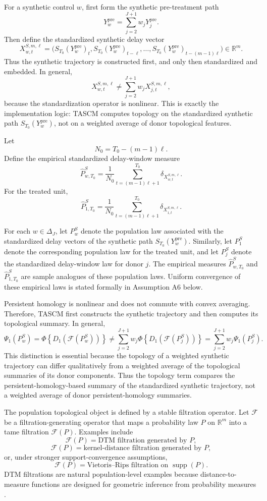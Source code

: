 \documentclass[11pt]{article}
\theoremstyle{plain}
\theoremstyle{definition}
\theoremstyle{remark}
\DeclareMathOperator{\supp}{supp}
\newcommand{\1}{\mathbbm{1}}
\newcommand{\pre}{\mathrm{pre}}
\begin{document}
For a synthetic control \(w\), first form the synthetic pre-treatment path
\[
Y_w^{\pre}
=
\sum_{j=2}^{J+1}w_jY_j^{\pre}.
\]
Then define the standardized synthetic delay vector
\[
X_{w,t}^{S,m,\ell}
=
\bigl(
S_{T_0}(Y_w^{\pre})_t,
S_{T_0}(Y_w^{\pre})_{t-\ell},
\ldots,
S_{T_0}(Y_w^{\pre})_{t-(m-1)\ell}
\bigr)
\in\mathbb R^m.
\]
Thus the synthetic trajectory is constructed first, and only then standardized
and embedded. In general,
\[
X_{w,t}^{S,m,\ell}
\neq
\sum_{j=2}^{J+1}w_jX_{j,t}^{S,m,\ell},
\]
because the standardization operator is nonlinear. This is exactly the
implementation logic: TASCM computes topology on the standardized synthetic
path \(S_{T_0}(Y_w^{\pre})\), not on a weighted average of donor topological
features.

Let
\[
N_0=T_0-(m-1)\ell.
\]
Define the empirical standardized delay-window measure
\[
\widehat P_{w,T_0}^{S}
=
\frac{1}{N_0}
\sum_{t=(m-1)\ell+1}^{T_0}
\delta_{X_{w,t}^{S,m,\ell}}.
\]
For the treated unit,
\[
\widehat P_{1,T_0}^{S}
=
\frac{1}{N_0}
\sum_{t=(m-1)\ell+1}^{T_0}
\delta_{X_{1,t}^{S,m,\ell}}.
\]

For each \(w\in\Delta_J\), let \(P_w^{S}\) denote the population law associated
with the standardized delay vectors of the synthetic path
\(S_{T_0}(Y_w^{\pre})\). Similarly, let \(P_1^{S}\) denote the corresponding
population law for the treated unit, and let \(P_j^{S}\) denote the
standardized delay-window law for donor \(j\). The empirical measures
\(\widehat P_{w,T_0}^{S}\) and \(\widehat P_{1,T_0}^{S}\) are sample analogues
of these population laws. Uniform convergence of these empirical laws is stated
formally in Assumption A6 below.

Persistent homology is nonlinear and does not commute with convex averaging.
Therefore, TASCM first constructs the synthetic trajectory and then computes its
topological summary. In general,
\[
\Psi_1(P_w^{S})
=
\Phi\left\{
D_1\left(
\mathcal F(P_w^{S})
\right)
\right\}
\neq
\sum_{j=2}^{J+1}w_j
\Phi\left\{
D_1\left(
\mathcal F(P_j^{S})
\right)
\right\}
=
\sum_{j=2}^{J+1}w_j\Psi_1(P_j^{S}).
\]
This distinction is essential because the topology of a weighted synthetic
trajectory can differ qualitatively from a weighted average of the topological
summaries of its donor components. Thus the topology term compares the
persistent-homology-based summary of the standardized synthetic trajectory, not
a weighted average of donor persistent-homology summaries.

The population topological object is defined by a stable filtration operator.
Let \(\mathcal F\) be a filtration-generating operator that maps a probability
law \(P\) on \(\mathbb R^m\) into a tame filtration \(\mathcal F(P)\). Examples
include
\[
\mathcal F(P)
=
\text{DTM filtration generated by }P,
\]
\[
\mathcal F(P)
=
\text{kernel-distance filtration generated by }P,
\]
or, under stronger support-convergence assumptions,
\[
\mathcal F(P)
=
\text{Vietoris--Rips filtration on } \supp(P).
\]
DTM filtrations are natural population-level examples because
distance-to-measure functions are designed for geometric inference from
probability measures \citep{chazal2011geometric}.
\end{document}
